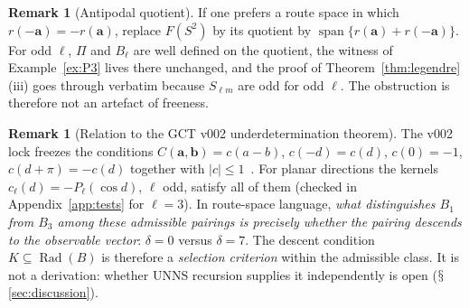 \documentclass[11pt,a4paper]{article}
\renewcommand{\S}{\ensuremath{\mathsection}}
\newcommand{\Rad}{\operatorname{Rad}}
\newcommand{\spn}{\operatorname{span}}
\newcommand{\defic}{\delta}
\theoremstyle{plain}
\theoremstyle{definition}
\newtheorem{remark}[theorem]{Remark}
\begin{document}
\begin{remark}[Antipodal quotient]
If one prefers a route space in which $r(-\mathbf a)=-r(\mathbf a)$, replace $F(S^2)$ by its quotient by $\spn\{r(\mathbf a)+r(-\mathbf a)\}$. For odd $\ell$, $\Pi$ and $B_\ell$ are well defined on the quotient, the witness of Example~\ref{ex:P3} lives there unchanged, and the proof of Theorem~\ref{thm:legendre}(iii) goes through verbatim because $S_{\ell m}$ are odd for odd $\ell$. The obstruction is therefore not an artefact of freeness.
\end{remark}

\begin{remark}[Relation to the GCT v002 underdetermination theorem]\label{rem:gct}
The v002 lock freezes the conditions $C(\mathbf a,\mathbf b)=c(a-b)$, $c(-d)=c(d)$, $c(0)=-1$, $c(d+\pi)=-c(d)$ together with $|c|\le1$~\cite{G8,G2}. For planar directions the kernels $c_\ell(d)=-P_\ell(\cos d)$, $\ell$ odd, satisfy all of them (checked in Appendix~\ref{app:tests} for $\ell=3$). In route-space language, \emph{what distinguishes $B_1$ from $B_3$ among these admissible pairings is precisely whether the pairing descends to the observable vector}: $\defic=0$ versus $\defic=7$. The descent condition $K\subseteq\Rad(B)$ is therefore a \emph{selection criterion} within the admissible class. It is not a derivation: whether UNNS recursion supplies it independently is open (\S\ref{sec:discussion}).
\end{remark}
\end{document}
